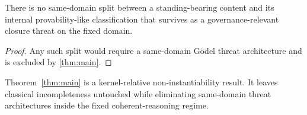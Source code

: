 \begin{corollary}
There is no same-domain split between a standing-bearing content and its internal provability-like classification that survives as a governance-relevant closure threat on the fixed domain.
\end{corollary}

\begin{proof}
Any such split would require a same-domain G\"odel threat architecture and is excluded by \cref{thm:main}.
\end{proof}

\begin{corollary}
Theorem~\ref{thm:main} is a kernel-relative non-instantiability result. It leaves classical incompleteness untouched while eliminating same-domain threat architectures inside the fixed coherent-reasoning regime.
\end{corollary}
